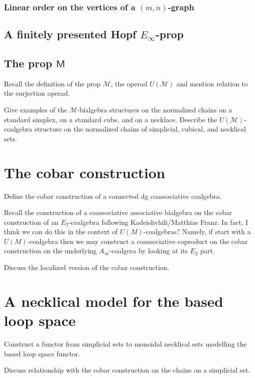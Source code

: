 \documentclass{amsart}
\newcommand{\M}{\mathsf{M}}
\begin{document}
\subsubsection{Linear order on the vertices of a $(m, n)$-graph}

\subsection{A finitely presented Hopf $E_{\infty}$-prop}

\subsection{The prop $\M$}
Recall the definition of the prop $\mathcal{M}$, the operad $U(\mathcal{M})$ and mention relation to the surjection operad. 

Give examples of the $\mathcal{M}$-bialgebra structures on the normalized chains on a standard simplex, on a standard cube, and on a necklace. Describe the $U(\mathcal{M})$-coalgebra structure on the normalized chains of simplicial, cubical, and necklical sets. 

\section{The cobar construction}

Define the cobar construction of a connected dg coassociative coalgebra. 

Recall the construction of a coassociative associative bialgebra on the cobar construction of an $E_2$-coalgebra following Kadeishvhili/Matthias Franz. In fact, I think we can do this in the context of $U(M)$-coalgebras? Namely, if start with a $U(M)$-coalgebra then we may construct a coassociative coproduct on the cobar construction on the underlying $A_{\infty}$-coalgera by looking at its $E_2$ part.

Discuss the localized version of the cobar construction.

\section{A necklical model for the based loop space}

Construct a functor from simplicial sets to monoidal necklical sets modelling the based loop space functor. 

Discuss relationship with the cobar construction on the chains on a simplicial set. 
\end{document}
